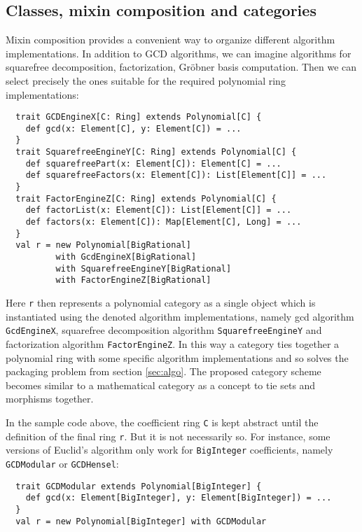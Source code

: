 \documentclass{llncs}
\newcommand{\code}[1]{\texttt{#1}}
\begin{document}
\subsection{Classes, mixin composition and categories} %

Mixin composition provides a convenient way to organize different
algorithm implementations. In addition to GCD algorithms, we can
imagine algorithms for squarefree decomposition, factorization,
Gr\"obner basis computation. Then we can select precisely the ones
suitable for the required polynomial ring implementations:
%
\begin{verbatim}
  trait GCDEngineX[C: Ring] extends Polynomial[C] {
    def gcd(x: Element[C], y: Element[C]) = ...
  }
  trait SquarefreeEngineY[C: Ring] extends Polynomial[C] {
    def squarefreePart(x: Element[C]): Element[C] = ...
    def squarefreeFactors(x: Element[C]): List[Element[C]] = ...
  }
  trait FactorEngineZ[C: Ring] extends Polynomial[C] {
    def factorList(x: Element[C]): List[Element[C]] = ...
    def factors(x: Element[C]): Map[Element[C], Long] = ...
  }
  val r = new Polynomial[BigRational]
          with GcdEngineX[BigRational] 
          with SquarefreeEngineY[BigRational]
          with FactorEngineZ[BigRational]
\end{verbatim}
%
Here \code{r} then represents a polynomial category as a single object
which is instantiated using the denoted algorithm implementations,
namely gcd algorithm \code{Gcd\-Engine\-X}, squarefree decomposition
algorithm \code{Square\-free\-Engine\-Y} and factorization algorithm
\code{Factor\-Engine\-Z}. In this way a category ties together a
polynomial ring with some specific algorithm implementations and so
solves the packaging problem from section \ref{sec:algo}.
The proposed category scheme becomes similar to a mathematical
category as a concept to tie sets and morphisms together.

In the sample code above, the coefficient ring \code{C} is kept abstract until
the definition of the final ring \code{r}. But it is not necessarily so. For
instance, some versions of Euclid's algorithm only work for \code{Big\-Integer}
coefficients, namely \code{GCD\-Modular} or \code{GCD\-Hensel}:
%
\begin{verbatim}
  trait GCDModular extends Polynomial[BigInteger] {
    def gcd(x: Element[BigInteger], y: Element[BigInteger]) = ...
  }
  val r = new Polynomial[BigInteger] with GCDModular
\end{verbatim}
\end{document}
